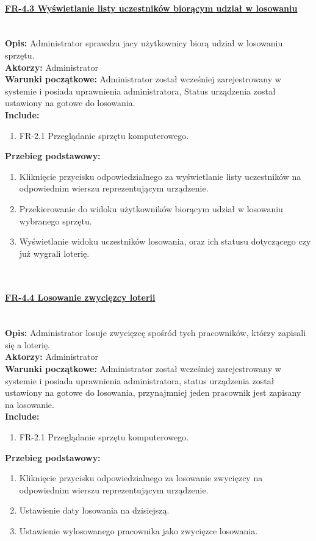 \paragraph{\underline{FR-4.3 Wyświetlanie listy uczestników biorącym udział w losowaniu}}\mbox{}\\[1mm]
	\noindent\textbf{Opis:} Administrator sprawdza jacy użytkownicy biorą udział w losowaniu sprzętu.\\
	\noindent\textbf{Aktorzy:} Administrator\\
	\textbf{Warunki początkowe:} Administrator został wcześniej zarejestrowany w systemie i posiada uprawnienia administratora, Status urządzenia został ustawiony na gotowe do losowania.\\
	\textbf{Include:} 
	\begin{enumerate}[noparskip]
		\item FR-2.1 Przeglądanie sprzętu komputerowego.
	\end{enumerate}
  \textbf{Przebieg podstawowy:}
	\begin{enumerate}[noparskip]
		\item Kliknięcie przycisku odpowiedzialnego za wyświetlanie listy uczestników na odpowiednim wierszu reprezentującym urządzenie.
		\item Przekierowanie do widoku użytkowników biorącym udział w losowaniu wybranego sprzętu.
		\item Wyświetlanie widoku uczestników losowania, oraz ich statusu dotyczącego czy już wygrali loterię.
  \end{enumerate} \mbox{}\\[-11mm]

\paragraph{\underline{FR-4.4 Losowanie zwycięzcy loterii}}\mbox{}\\[1mm]
	\noindent\textbf{Opis:} Administrator losuje zwycięzcę spośród tych pracowników, którzy zapisali się a loterię.\\
	\noindent\textbf{Aktorzy:} Administrator\\
	\textbf{Warunki początkowe:} Administrator został wcześniej zarejestrowany w systemie i posiada uprawnienia administratora, status urządzenia został ustawiony na gotowe do losowania, przynajmniej jeden pracownik jest zapisany na losowanie.\\
	\textbf{Include:} 
	\begin{enumerate}[noparskip]
		\item FR-2.1 Przeglądanie sprzętu komputerowego.
	\end{enumerate}
  \textbf{Przebieg podstawowy:}
	\begin{enumerate}[noparskip]
		\item Kliknięcie przycisku odpowiedzialnego za losowanie zwycięzcy na odpowiednim wierszu reprezentującym urządzenie.
		\item Ustawienie daty losowania na dzisiejszą.
		\item Ustawienie wylosowanego pracownika jako zwycięzce losowania.
  \end{enumerate} \mbox{}\\[-11mm]

